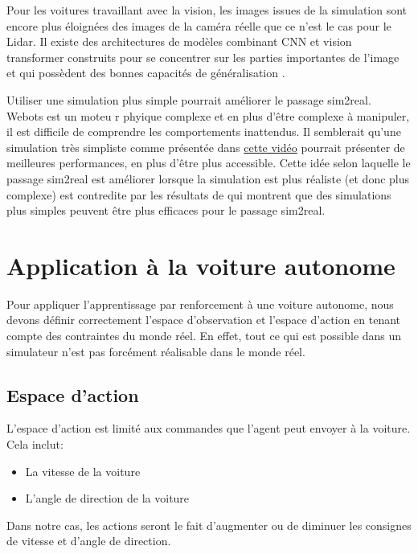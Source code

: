 \documentclass[french]{article}
\begin{document}
\vspace{0.5cm}

Pour les voitures travaillant avec la vision, les images issues de la simulation sont encore plus éloignées des images de la caméra réelle que ce n'est le cas pour le Lidar. Il existe des architectures de modèles combinant CNN et vision transformer construits pour se concentrer sur les parties importantes de l'image et qui possèdent des bonnes capacités de généralisation \cite{li2023style}.

\vspace{0.5cm}

Utiliser une simulation plus simple pourrait améliorer le passage sim2real. Webots est un moteu r phyique complexe et en plus d'être complexe à manipuler, il est difficile de comprendre les comportements inattendus. Il semblerait qu'une simulation très simpliste comme présentée dans \href{https://www.youtube.com/watch?v=Cy155O5R1Oo&list=PLg2V2juOLiPWxd5fQOz1la37etAf9_WoW&index=4}{cette vidéo} pourrait présenter de meilleures performances, en plus d'être plus accessible. Cette idée selon laquelle le passage sim2real est améliorer lorsque la simulation est plus réaliste (et donc plus complexe) est contredite par les résultats de \cite{pmlr-v205-truong23a} qui montrent que des simulations plus simples peuvent être plus efficaces pour le passage sim2real.



\section{Application à la voiture autonome}
Pour appliquer l'apprentissage par renforcement à une voiture autonome, nous devons définir correctement 
l'espace d'observation et l'espace d'action en tenant compte des contraintes du monde réel. En effet, 
tout ce qui est possible dans un simulateur n'est pas forcément réalisable dans le monde réel. 

\subsection{Espace d'action}
L'espace d'action est limité aux commandes que l'agent peut envoyer à la voiture. Cela inclut:
\begin{itemize}
    \item La vitesse de la voiture
    \item L'angle de direction de la voiture
\end{itemize}
Dans notre cas, les actions seront le fait d'augmenter ou de diminuer les consignes de vitesse et d'angle de direction.
\end{document}
